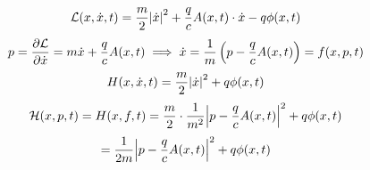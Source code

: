 \begin{example}
    \begin{equation}
        \mathcal{L}(x,\dot{x},t)= \frac{m}{2}\abs{\dot{x}}^2 + \frac{q}{c}A(x,t)\cdot \dot{x} - q\phi(x,t)
    \end{equation}
    \begin{equation}
        p= \pdv{\mathcal{L}}{\dot{x}}= m\dot{x}+ \frac{q}{c}A(x,t) 
        \implies \dot{x}= \frac{1}{m}\left(p- \frac{q}{c}A(x,t)\right)= f(x,p,t)
    \end{equation}
    \begin{equation}
        H(x,\dot{x},t)= \frac{m}{2}\abs{\dot{x}}^2 + q\phi(x,t)
    \end{equation}
    \begin{equation}
        \mathcal{H}(x,p,t)= H(x,f,t)= \frac{m}{2}\cdot \frac{1}{m^2}\abs{p- \frac{q}{c}A(x,t)}^2 + q\phi(x,t)
    \end{equation}
    \begin{equation*}
        = \frac{1}{2m}\abs{p- \frac{q}{c}A(x,t)}^2 + q\phi(x,t)
    \end{equation*}
\end{example}
